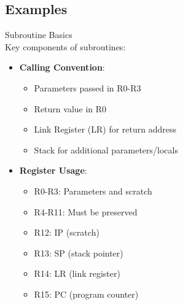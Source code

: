 \subsection{Examples}

\begin{concept}{Subroutine Basics}\\
Key components of subroutines:
\begin{itemize}
  \item \textbf{Calling Convention}:
    \begin{itemize}
      \item Parameters passed in R0-R3
      \item Return value in R0
      \item Link Register (LR) for return address
      \item Stack for additional parameters/locals
    \end{itemize}
  \item \textbf{Register Usage}:
    \begin{itemize}
      \item R0-R3: Parameters and scratch
      \item R4-R11: Must be preserved
      \item R12: IP (scratch)
      \item R13: SP (stack pointer)
      \item R14: LR (link register)
      \item R15: PC (program counter)
    \end{itemize}
\end{itemize}
\end{concept}

